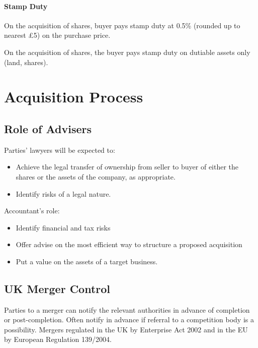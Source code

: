 \documentclass[
]{article}
\providecommand{\tightlist}{%
  \setlength{\itemsep}{0pt}\setlength{\parskip}{0pt}}
\begin{document}
\hypertarget{stamp-duty}{%
\paragraph{Stamp Duty}\label{stamp-duty}}

On the acquisition of shares, buyer pays stamp duty at 0.5\% (rounded up
to nearest £5) on the purchase price.

On the acquisition of shares, the buyer pays stamp duty on dutiable
assets only (land, shares).

\hypertarget{acquisition-process}{%
\section{Acquisition Process}\label{acquisition-process}}

\hypertarget{role-of-advisers}{%
\subsection{Role of Advisers}\label{role-of-advisers}}

Parties' lawyers will be expected to:

\begin{itemize}
\tightlist
\item
  Achieve the legal transfer of ownership from seller to buyer of either
  the shares or the assets of the company, as appropriate.
\item
  Identify risks of a legal nature.
\end{itemize}

Accountant's role:

\begin{itemize}
\tightlist
\item
  Identify financial and tax risks
\item
  Offer advise on the most efficient way to structure a proposed
  acquisition
\item
  Put a value on the assets of a target business.
\end{itemize}

\hypertarget{uk-merger-control}{%
\subsection{UK Merger Control}\label{uk-merger-control}}

Parties to a merger can notify the relevant authorities in advance of
completion or post-completion. Often notify in advance if referral to a
competition body is a possibility. Mergers regulated in the UK by
Enterprise Act 2002 and in the EU by European Regulation 139/2004.
\end{document}
